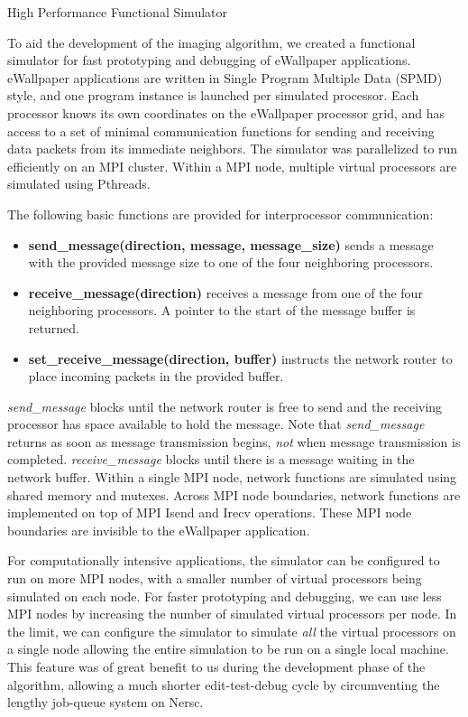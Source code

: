 \documentclass[twocolumn]{article}
\makeatletter
\def\section{\@startsection{section}{1}{\z@}{24pt plus 2 pt
minus 2 pt} {12pt plus 2pt minus 2pt}{\large\bf}}
\makeatother
\begin{document}
\section{High Performance Functional Simulator}

To aid the development of the imaging algorithm, we created a functional simulator for fast prototyping and debugging of eWallpaper applications. eWallpaper applications are written in Single Program Multiple Data (SPMD) style, and one program instance is launched per simulated processor. Each processor knows its own coordinates on the eWallpaper processor grid, and has access to a set of minimal communication functions for sending and receiving data packets from its immediate neighbors. The simulator was parallelized to run efficiently on an MPI cluster. Within a MPI node, multiple virtual processors are simulated using Pthreads. 

The following basic functions are provided for interprocessor communication:
\begin{itemize}
	\item \textbf{send\_message(direction, message, message\_size)} sends a message with the provided message size to one of the four neighboring processors.
	\item \textbf{receive\_message(direction)} receives a message from one of the four neighboring processors. A pointer to the start of the message buffer is returned.
	\item \textbf{set\_receive\_message(direction, buffer)} instructs the network router to place incoming packets in the provided buffer.
\end{itemize}

{\em send\_message} blocks until the network router is free to send and the receiving processor has space available to hold the message. Note that {\em send\_message} returns as soon as message transmission begins, {\em not} when message transmission is completed. {\em receive\_message} blocks until there is a message waiting in the network buffer. Within a single MPI node, network functions are simulated using shared memory and mutexes. Across MPI node boundaries, network functions are implemented on top of MPI Isend and Irecv operations. These MPI node boundaries are invisible to the eWallpaper application.

For computationally intensive applications, the simulator can be configured to run on more MPI nodes, with a smaller number of virtual processors being simulated on each node. For faster prototyping and debugging, we can use less MPI nodes by increasing the number of simulated virtual processors per node. In the limit, we can configure the simulator to simulate {\em all} the virtual processors on a single node allowing the entire simulation to be run on a single local machine. This feature was of great benefit to us during the development phase of the algorithm, allowing a much shorter edit-test-debug cycle by circumventing the lengthy job-queue system on Nersc. 
\end{document}
